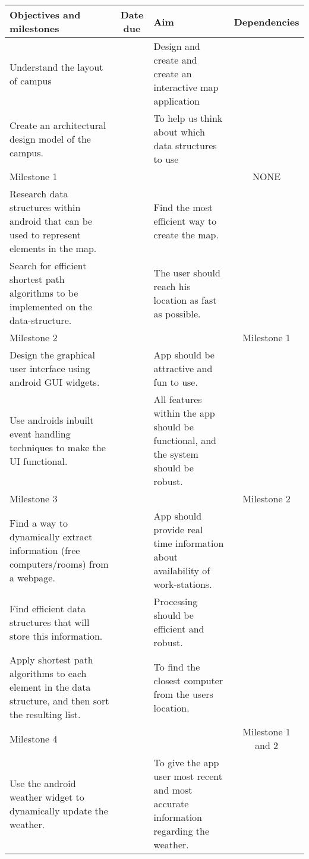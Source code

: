 \documentclass[10pt,a4paper,oneside]{report}
\begin{document}
\begin{table}[H]
\hspace*{-2cm}
\begin{tabularx}{1.3\textwidth}{ |S|E|S|E| }
  \hline
  \bf{Objectives and milestones} & \bf{Date due} & \bf{Aim} & \bf{Dependencies} \\ \hline
  Understand the layout of campus & ~ &
  Design and create and create an interactive map application & ~ \\ \hline
  Create an architectural design model of the campus. & ~ &
  To help us think about which data structures to use & ~ \\ \hline
  Milestone 1 & ~ & ~ & NONE \\ \hline
  Research data structures within android that can be used to represent elements in the map. & ~ & Find the most efficient way to create the map. & ~ \\ \hline
  Search for efficient shortest path algorithms to be implemented on the data-structure. & ~ & The user should reach his location as fast as possible. & ~ \\ \hline
  Milestone 2 & ~ & ~ &Milestone 1 \\ \hline
  Design the graphical user interface using android GUI widgets. & ~ & App should be attractive and fun to use. & \\ \hline
  Use androids inbuilt event handling techniques to make the UI functional. & ~ & All features within the app should be functional, and the system should be robust. & ~ \\ \hline
  Milestone 3 & ~ & ~ & Milestone 2 \\ \hline
  Find a way to dynamically extract information (free computers/rooms) from a webpage. & ~ & App should provide real time information about availability of work-stations. & ~\\ \hline
  Find efficient data structures that will store this information. & ~ & Processing should be efficient and robust. & ~ \\ \hline
  Apply shortest path algorithms to each element in the data structure, and then sort the resulting list. & ~ & To find the closest computer from the users location. & ~\\ \hline
  Milestone 4 & ~ & ~ & Milestone 1 and 2 \\ \hline
  Use the android weather widget to dynamically update the weather. & ~ & To give the app user most recent and most accurate information regarding the weather. & ~ \\ \hline

\end{tabularx}
\end{table}
\end{document}
